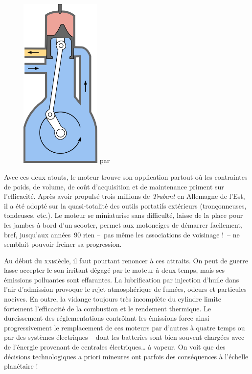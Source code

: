 	\begin{figure}
		\begin{center}
			\includegraphics[width=4cm]{images/admission_carter.png}
			{ \pd par }
			\label{fig_admission_carter}
		\end{center}
	\end{figure}

	Avec ces deux atouts, le moteur trouve son application partout où les contraintes de poids, de volume, de coût d’acquisition et de maintenance priment sur l’efficacité. Après avoir propulsé trois millions de \textit{Trabant} en Allemagne de l’Est, il a été adopté sur la quasi-totalité des outils portatifs extérieurs (tronçonneuses, tondeuses, etc.). Le moteur se miniaturise sans difficulté, laisse de la place pour les jambes à bord d’un scooter, permet aux motoneiges de démarrer facilement, bref, jusqu’aux années~90 rien --\ pas même les associations de voisinage !\ -- ne semblait pouvoir freiner sa progression.

	Au début du \textsc{xxi}\ieme siècle, il faut pourtant renoncer à ces attraits. On peut de guerre lasse accepter le son irritant dégagé par le moteur à deux temps, mais ses émissions polluantes sont effarantes. La lubrification par injection d’huile dans l’air d’admission provoque le rejet atmosphérique de fumées, odeurs et particules nocives. En outre, la vidange toujours très incomplète du cylindre limite fortement l’efficacité de la combustion et le rendement thermique. Le durcissement des réglementations contrôlant les émissions force ainsi progressivement le remplacement de ces moteurs par d’autres à quatre temps ou par des systèmes électriques -- dont les batteries sont bien souvent chargées avec de l’énergie provenant de centrales électriques… à vapeur. On voit que des décisions technologiques a priori mineures ont parfois des conséquences à l’échelle planétaire !
	
\atendofhistorysection
